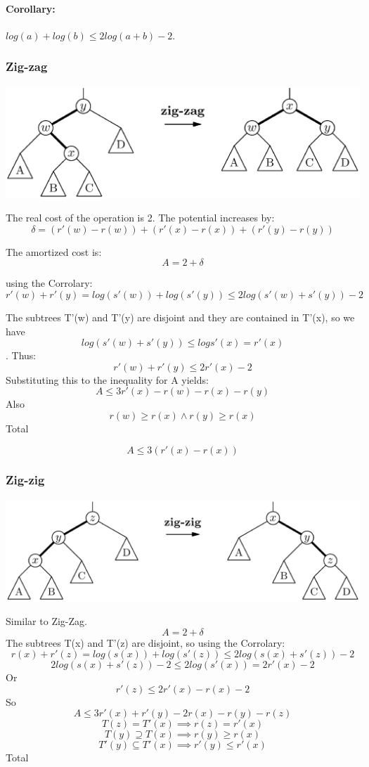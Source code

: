 \documentclass[12pt]{article}
\begin{document}
\paragraph{Corollary:} $ log(a) + log(b) \leq 2log(a + b) - 2 $.

\subsubsection*{Zig-zag}
\includegraphics[scale=0.3]{zig_zag.eps}

The real cost of the operation is 2. The potential increases by:
\[ \delta = (r'(w) - r(w)) + (r'(x) - r(x)) + (r'(y) - r(y)) \]

The amortized cost is:
\[ A = 2 + \delta \]

using the Corrolary:
\[ r'(w) + r'(y) = log(s'(w)) + log(s'(y)) \leq 2log(s'(w) + s'(y)) - 2 \]

The subtrees T'(w) and T'(y) are disjoint and they are contained in T'(x), so we have
\[log(s'(w) + s'(y)) \leq log s'(x) = r'(x)\].
Thus:
\[ r'(w) + r'(y) \leq 2r'(x) - 2 \]
Substituting this to the inequality for A yields:
\[ A \leq 3r'(x) - r(w) - r(x) - r(y) \]
Also
\[ r(w) \geq r(x) \land r(y) \geq r(x) \]
Total

\[ A \leq 3(r'(x) - r(x)) \]

\subsubsection*{Zig-zig}
\includegraphics[scale=0.3]{zig_zig.eps}

Similar to Zig-Zag.
\[ A = 2 + \delta \]
The subtrees T(x) and T'(z) are disjoint, so using the Corrolary:
\[ r(x) + r'(z) = log(s(x)) + log(s'(z)) \leq 2log(s(x) + s'(z)) - 2 \]
\[ 2log(s(x) + s'(z)) - 2 \leq 2log(s'(x)) = 2r'(x) - 2 \]
Or
\[ r'(z) \leq 2r'(x) - r(x) - 2 \]
So
\[ A \leq 3r'(x) + r'(y) - 2r(x) - r(y) - r(z) \]
\[ T(z) = T'(x) \implies r(z) = r'(x) \]
\[ T(y) \supseteq T(x) \implies r(y) \geq r(x) \]
\[ T'(y) \subseteq T'(x) \implies r'(y) \leq r'(x) \]
Total
\end{document}
